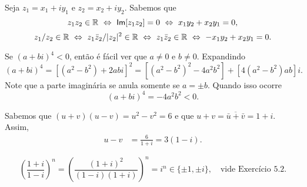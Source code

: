 \begin{questions}
\begin{solution}
    Seja $z_1 = x_1 + i y_1$ e $z_2 = x_2 + i y_2$.
    Sabemos que 
    \[
        z_1 z_2 \in {\mathbb R} 
            ~\Leftrightarrow~ \mathsf{Im}[z_1 z_2] = 0
            ~\Leftrightarrow~ x_1y_2+x_2y_1 = 0,
    \]
    \[
        z_1/z_2 \in {\mathbb R} 
            ~\Leftrightarrow~ z_1 \bar{z}_2/|z_2|^2 \in {\mathbb R}
            ~\Leftrightarrow~ z_1 \bar{z}_2 \in {\mathbb R}
            ~\Leftrightarrow~ -x_1y_2+x_2y_1 = 0.
    \]
\end{solution}


\begin{solution}
    Se $(a + bi)^4<0$, então é fácil ver que $a\neq 0$ e $b\neq 0$.
    Expandindo
    \[
        (a+bi)^4 = \left[(a^2-b^2) + 2abi \right]^2
            = \left[ (a^2-b^2)^2-4a^2b^2 \right] + \left[4(a^2-b^2)ab\right]i.
    \]
    Note que a parte imaginária se anula somente se $a=\pm b$. Quando isso ocorre \[(a + bi)^4 = -4a^2b^2 < 0.\]
\end{solution}



\begin{solution}
Sabemos que $(u+v)(u-v) = u^2-v^2 = 6$ e que $u+v = \overline{\bar u + \bar v} = 1+i$. Assim,
\begin{align*}
    u-v &= \frac{6}{1+i} = 3(1-i).
\end{align*}
\end{solution}


\begin{solution}
    \[\left(\frac{1+i}{1-i}\right)^n = \left(\frac{(1+i)^2}{(1-i)(1+i)}\right)^n = i^n \in \{\pm 1,\pm i\}, \quad \text{vide Exercício 5.2.} \]
\end{solution}



\end{questions}

